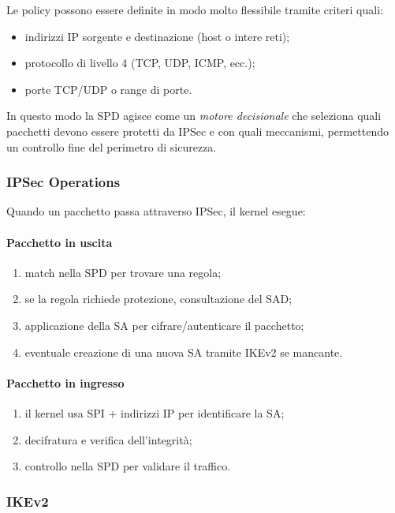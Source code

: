 Le policy possono essere definite in modo molto flessibile tramite criteri quali:

\begin{itemize}
    \item indirizzi IP sorgente e destinazione (host o intere reti);
    \item protocollo di livello 4 (TCP, UDP, ICMP, ecc.);
    \item porte TCP/UDP o range di porte.
\end{itemize}

In questo modo la SPD agisce come un \textit{motore decisionale} che seleziona quali
pacchetti devono essere protetti da IPSec e con quali meccanismi, permettendo
un controllo fine del perimetro di sicurezza.

\subsubsection{IPSec Operations}

Quando un pacchetto passa attraverso IPSec, il kernel esegue:

\paragraph{Pacchetto in uscita}
\begin{enumerate}
    \item match nella SPD per trovare una regola;
    \item se la regola richiede protezione, consultazione del SAD;
    \item applicazione della SA per cifrare/autenticare il pacchetto;
    \item eventuale creazione di una nuova SA tramite IKEv2 se mancante.
\end{enumerate}

\paragraph{Pacchetto in ingresso}
\begin{enumerate}
    \item il kernel usa SPI + indirizzi IP per identificare la SA;
    \item decifratura e verifica dell’integrità;
    \item controllo nella SPD per validare il traffico.
\end{enumerate}

\subsubsection{IKEv2}

